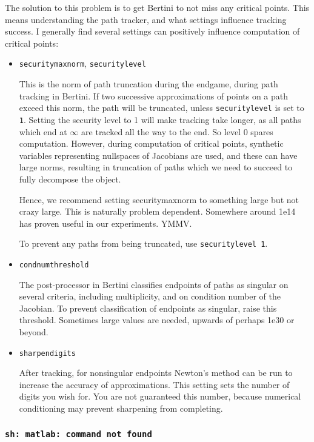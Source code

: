 The solution to this problem is to get Bertini to not miss any critical points.  This means understanding the path tracker, and what settings influence tracking success.  I generally find several settings can positively influence computation of critical points:
\begin{itemize}
\item {\tt securitymaxnorm}, {\tt securitylevel}

 This is the norm of path truncation during the endgame, during path tracking in Bertini.  If two successive approximations of points on a path exceed this norm, the path will be truncated, unless {\tt securitylevel} is set to {\tt 1}.  Setting the security level to 1 will make tracking take longer, as all paths which end at $\infty$ are tracked all the way to the end.  So level 0 spares computation.  However, during computation of critical points, synthetic variables representing nullspaces of Jacobians are used, and these can have large norms, resulting in truncation of paths which we need to succeed to fully decompose the object.  

Hence, we recommend setting securitymaxnorm to something large but not crazy large.  This is naturally problem dependent.  Somewhere around 1e14 has proven useful in our experiments.  YMMV.

To prevent any paths from being truncated, use {\tt securitylevel 1}.

\item {\tt condnumthreshold}

The post-processor in Bertini classifies endpoints of paths as singular on several criteria, including multiplicity, and on condition number of the Jacobian.  To prevent classification of endpoints as singular, raise this threshold.  Sometimes large values are needed, upwards of perhaps 1e30 or beyond.  

\item {\tt sharpendigits}

After tracking, for nonsingular endpoints Newton's method can be run to increase the accuracy of approximations.  This setting sets the number of digits you wish for.  You are not guaranteed this number, because numerical conditioning may prevent sharpening from completing.

\end{itemize}





\subsubsection{\tt sh: matlab: command not found}

